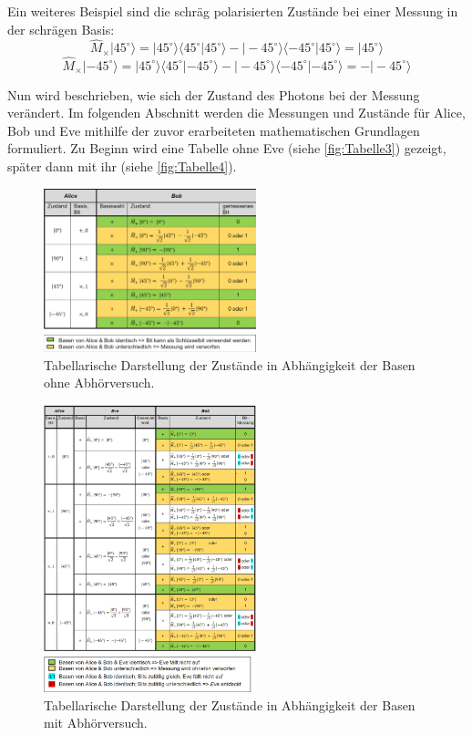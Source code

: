 Ein weiteres Beispiel sind die schräg polarisierten Zustände bei einer Messung in der schrägen Basis:
\[
\hat{M}_\times |45^\circ \rangle = |45^\circ \rangle \langle 45^\circ | 45^\circ \rangle - |-45^\circ \rangle \langle -45^\circ | 45^\circ \rangle = |45^\circ \rangle
\]
\[
\hat{M}_\times |-45^\circ \rangle = |45^\circ \rangle \langle 45^\circ | -45^\circ \rangle - |-45^\circ \rangle \langle -45^\circ | -45^\circ \rangle = -|-45^\circ \rangle
\]

Nun wird beschrieben, wie sich der Zustand des Photons bei der Messung verändert. Im folgenden Abschnitt werden die Messungen und Zustände für Alice, Bob und Eve mithilfe der zuvor erarbeiteten mathematischen Grundlagen formuliert. Zu Beginn wird eine Tabelle ohne Eve (siehe \autoref{fig:Tabelle3}) gezeigt, später dann mit ihr (siehe \autoref{fig:Tabelle4}).


\begin{figure}[H]
	\centering
	\includegraphics[width=0.55\textwidth]{content/grafik/Tabelle3.png}
	\caption{Tabellarische Darstellung der Zustände in Abhängigkeit der Basen ohne Abhörversuch. \cite{krypt}}
	\label{fig:Tabelle3}
\end{figure}

\begin{figure}[H]
	\centering
	\includegraphics[width=0.55\textwidth]{content/grafik/Tabelle4.png}
	\caption{Tabellarische Darstellung der Zustände in Abhängigkeit der Basen mit Abhörversuch. \cite{krypt}}
	\label{fig:Tabelle4}
\end{figure}



